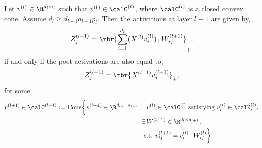 \documentclass{article}
\newcommand{\calKl}{\calK^{(l)}}
\begin{document}
\begin{lemma}
    Let \( v^{(l)} \in \R^{d_l \cdot a_{l}} \) such that
    \( v^{(l)} \in \calC^{(l)} \), where \( \calC^{(l)} \) is a closed convex
    cone.
    Assume \( d_l \geq d_{l+1} a_{l+1} p_l \).
    Then the activations at layer \( l+1 \) are given by,
    \begin{equation}\label{eq:assumed-structure}
        Z_{j}^{(l+1)} = \rbr{\sum_{i = 1}^{d_{l}} (X^{(l)} v^{(l)}_i)_+
        W_{ij}^{(l+1)}}_+.
    \end{equation}
    if and only if the post-activations are also equal to,
    \begin{equation}
        Z_{j}^{(l+1)} = \rbr{X^{(l+1)} v^{(l+1)}_{j}}_+,
    \end{equation}
    for some
    \begin{equation}
        \begin{aligned}
            v^{(l+1)} \in \calC^{(l+1)}
            :=
            \text{Cone} \bigg\{
            v^{(l+1)} \in \R^{d_{l+1} \cdot a_{l+1}} :
             & \exists \, v^{(l)} \in \calC^{(l)}
            \text{ satisfying } v_{i}^{(l)} \in \calKl_i, \,                 \\
             & \exists \, W^{(l+1)} \in \R^{d_l \times d_{l+1}},             \\
             & \text{ s.t. } v^{(l+1)}_{ij} = v^{(l)}_{i} \cdot W_{ij}^{(l)}
            \bigg\}.
        \end{aligned}
    \end{equation}
\end{lemma}
\end{document}
